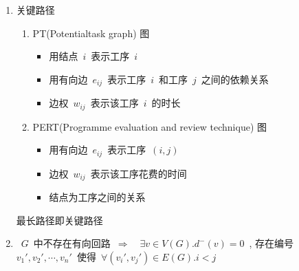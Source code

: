 \documentclass[11pt,a4paper]{article}%
\renewcommand{\[}{~$}
\renewcommand{\]}{$~}%
\begin{document}
\begin{enumerate}
\begin{enumerate}
	 	\end{enumerate}
	 \item 关键路径
	 	\begin{enumerate}
	 	 \item PT(Potentialtask graph) 图\\
	 	 	\begin{itemize}
	 	 	 \item 用结点\[i\]表示工序\[i\]
	 	 	 \item 用有向边\[e_{ij}\]表示工序\[i\]和工序\[j\]之间的依赖关系
	 	 	 \item 边权\[w_{ij}\]表示该工序\[i\]的时长
	 	 	\end{itemize}
	 	 \item PERT(Programme evaluation and review technique) 图\\
	 	 	\begin{itemize}
	 	 	 \item 用有向边\[e_{ij}\]表示工序\[(i,j)\]
	 	 	 \item 边权\[w_{ij}\]表示该工序花费的时间
	 	 	 \item 结点为工序之间的关系
	 	 	\end{itemize}
	 	\end{enumerate}
	 	最长路径即关键路径
	 \item \[G\]中不存在有向回路\[\Rightarrow\]\[\exists v\in V(G). d^-(v)=0\], 存在编号\[v_1',v_2',\cdots,v_n'\]使得\[\forall (v_i',v_j')\in E(G). i<j\]
	\end{enumerate}	
	
\end{document}
